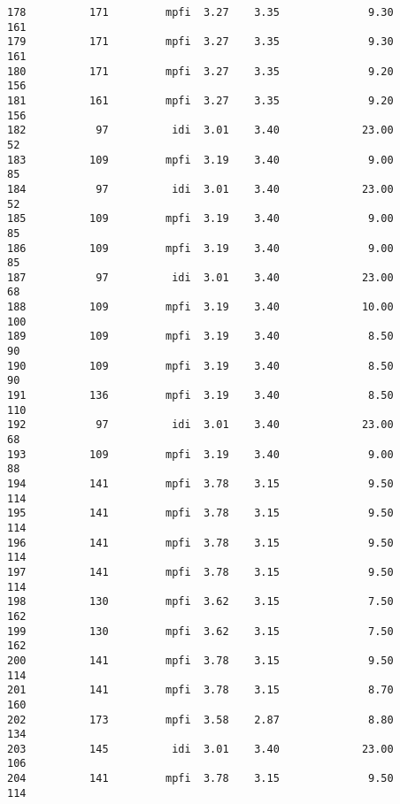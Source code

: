 \documentclass[11pt]{article}
\begin{document}
\begin{tcolorbox}[breakable, boxrule=.5pt, size=fbox, pad at break*=1mm, opacityfill=0]
\begin{Verbatim}[commandchars=\\\{\}]
178          171         mpfi  3.27    3.35              9.30        161
179          171         mpfi  3.27    3.35              9.30        161
180          171         mpfi  3.27    3.35              9.20        156
181          161         mpfi  3.27    3.35              9.20        156
182           97          idi  3.01    3.40             23.00         52
183          109         mpfi  3.19    3.40              9.00         85
184           97          idi  3.01    3.40             23.00         52
185          109         mpfi  3.19    3.40              9.00         85
186          109         mpfi  3.19    3.40              9.00         85
187           97          idi  3.01    3.40             23.00         68
188          109         mpfi  3.19    3.40             10.00        100
189          109         mpfi  3.19    3.40              8.50         90
190          109         mpfi  3.19    3.40              8.50         90
191          136         mpfi  3.19    3.40              8.50        110
192           97          idi  3.01    3.40             23.00         68
193          109         mpfi  3.19    3.40              9.00         88
194          141         mpfi  3.78    3.15              9.50        114
195          141         mpfi  3.78    3.15              9.50        114
196          141         mpfi  3.78    3.15              9.50        114
197          141         mpfi  3.78    3.15              9.50        114
198          130         mpfi  3.62    3.15              7.50        162
199          130         mpfi  3.62    3.15              7.50        162
200          141         mpfi  3.78    3.15              9.50        114
201          141         mpfi  3.78    3.15              8.70        160
202          173         mpfi  3.58    2.87              8.80        134
203          145          idi  3.01    3.40             23.00        106
204          141         mpfi  3.78    3.15              9.50        114


\end{Verbatim}
\end{tcolorbox}
\end{document}
